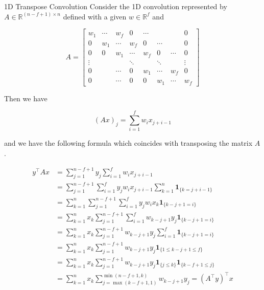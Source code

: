 \begin{frame}[allowframebreaks]

\begin{myexampleblock}{8.14}{1D Transpose Convolution}
    Consider the 1D convolution represented by $A \in \mathbb{R}^{(n-f+1) \times n}$ defined with a given $w \in \mathbb{R}^{f}$ and

    $$
    A=\left[\begin{array}{cccccccc}
    w_{1} & \cdots & w_{f} & 0 & \cdots & & & 0 \\
    0 & w_{1} & \cdots & w_{f} & 0 & \cdots & & 0 \\
    0 & 0 & w_{1} & \cdots & w_{f} & 0 & \cdots & 0 \\
    \vdots & & & \ddots & & \ddots & & \vdots \\
    0 & & \cdots & 0 & w_{1} & \cdots & w_{f} & 0 \\
    0 & & \cdots & 0 & 0 & w_{1} & \cdots & w_{f}
    \end{array}\right]
    $$

    Then we have

    $$
    (A x)_{j}=\sum_{i=1}^{f} w_{i} x_{j+i-1}
    $$

    \par\noindent\textcolor{gray}{\hdashrule{\textwidth}{0.4pt}{1pt 2pt}}

    and we have the following formula which coincides with transposing the matrix $A$.

    $$
    \begin{aligned}
    y^{\top} A x & =\sum_{j=1}^{n-f+1} y_{j} \sum_{i=1}^{f} w_{i} x_{j+i-1} \\
    & =\sum_{j=1}^{n-f+1} \sum_{i=1}^{f} y_{j} w_{i} x_{j+i-1} \sum_{k=1}^{n} \mathbf{1}_{\{k=j+i-1\}} \\
    & =\sum_{k=1}^{n} \sum_{j=1}^{n-f+1} \sum_{i=1}^{f} y_{j} w_{i} x_{k} \mathbf{1}_{\{k-j+1=i\}} \\
    & =\sum_{k=1}^{n} x_{k} \sum_{j=1}^{n-f+1} \sum_{i=1}^{f} w_{k-j+1} y_{j} \mathbf{1}_{\{k-j+1=i\}} \\
    & =\sum_{k=1}^{n} x_{k} \sum_{j=1}^{n-f+1} w_{k-j+1} y_{j} \sum_{i=1}^{f} \mathbf{1}_{\{k-j+1=i\}} \\
    & =\sum_{k=1}^{n} x_{k} \sum_{j=1}^{n-f+1} w_{k-j+1} y_{j} \mathbf{1}_{\{1 \leq k-j+1 \leq f\}} \\
    & =\sum_{k=1}^{n} x_{k} \sum_{j=1}^{n-f+1} w_{k-j+1} y_{j} \mathbf{1}_{\{j \leq k\}} \mathbf{1}_{\{k-f+1 \leq j\}} \\
    & =\sum_{k=1}^{n} x_{k} \sum_{j=\max (k-f+1,1)}^{\min (n-f+1, k)} w_{k-j+1} y_{j}=\left(A^{\top} y\right)^{\top} x \\
    \end{aligned}
    $$
\end{myexampleblock}

\end{frame}

